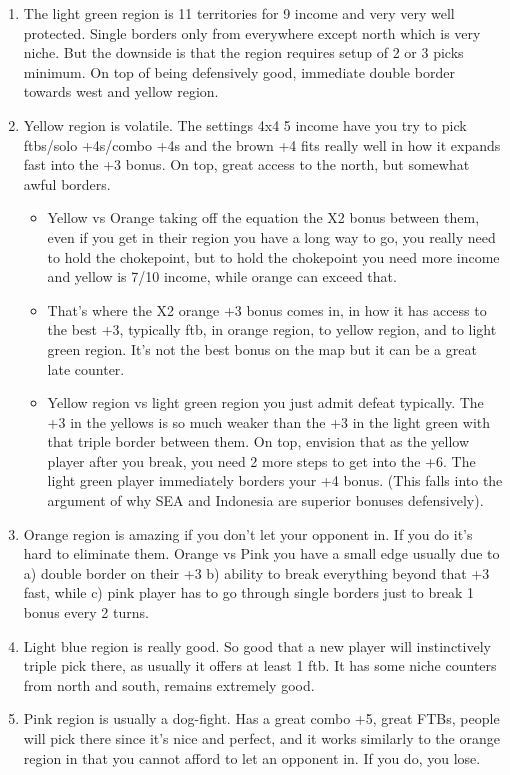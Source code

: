 \begin{enumerate}
    \item The light green region is 11 territories for 9 income and very very well protected. Single borders only from everywhere except north which is very niche. But the downside is that the region requires setup of 2 or 3 picks minimum. On top of being defensively good, immediate double border towards west and yellow region.
    \item Yellow region is volatile. The settings 4x4 5 income have you try to pick ftbs/solo +4s/combo +4s and the brown +4 fits really well in how it expands fast into the +3 bonus. On top, great access to the north, but somewhat awful borders.
    \begin{itemize}
        \item Yellow vs Orange taking off the equation the X2 bonus between them, even if you get in their region you have a long way to go, you really need to hold the chokepoint, but to hold the chokepoint you need more income and yellow is 7/10 income, while orange can exceed that. 
        \item That's where the X2 orange +3 bonus comes in, in how it has access to the best +3, typically ftb, in orange region, to yellow region, and to light green region. It's not the best bonus on the map but it can be a great late counter. 
        \item Yellow region vs light green region you just admit defeat typically. The +3 in the yellows is so much weaker than the +3 in the light green with that triple border between them. On top, envision that as the yellow player after you break, you need 2 more steps to get into the +6. The light green player immediately borders your +4 bonus. (This falls into the argument of why SEA and Indonesia are superior bonuses defensively).
    \end{itemize}
    \item Orange region is amazing if you don't let your opponent in. If you do it's hard to eliminate them. Orange vs Pink you have a small edge usually due to a) double border on their +3 b) ability to break everything beyond that +3 fast, while c) pink player has to go through single borders just to break 1 bonus every 2 turns.
    \item Light blue region is really good. So good that a new player will instinctively triple pick there, as usually it offers at least 1 ftb. It has some niche counters from north and south, remains extremely good. 
    \item Pink region is usually a dog-fight. Has a great combo +5, great FTBs, people will pick there since it's nice and perfect, and it works similarly to the orange region in that you cannot afford to let an opponent in. If you do, you lose.
\end{enumerate}

